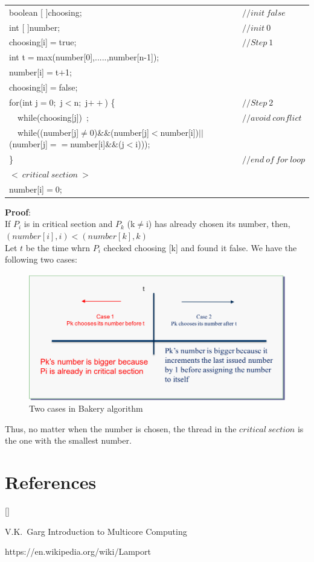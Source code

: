 \documentclass[twoside]{article}
\def\beginrefs{\begin{list}%
        {[\arabic{equation}]}{\usecounter{equation}
         \setlength{\leftmargin}{2.0truecm}\setlength{\labelsep}{0.4truecm}%
         \setlength{\labelwidth}{1.6truecm}}}
\def\endrefs{\end{list}}
\def\bibentry#1{\item[\hbox{[#1]}]}
\begin{document}
\begin{table}[ht]
    \centering
    \begin{tabular}{l  l}
         boolean [ ]choosing; & $//init\ false$ \\
         int [ ]number; & $//init\ 0$ \\
         choosing[i]$=$true; & $//Step\ 1$ \\
         int t$=$max(number[0],.....,number[n-1]); & \\
         number[i]$=$t$+$1; & \\
         choosing[i]$=$false; & \\
         for(int j$=$0;\ j$<$n;\ j$++$) \{ & $//Step\ 2$ \\
         \ \ while(choosing[j])\ ; & $//avoid\ conflict$ \\
         \ \ while((number[j]$\neq$0)\&\&(number[j]$<$number[i])$||$(number[j]$==$number[i]\&\&(j$<$i))); & \\
         \} & $//end\ of\ for\ loop$ \\
         $ <\ critical\ section\ > $ & \\
         number[i]$=$0; & \\
    \end{tabular}
\end{table} 

\textbf{Proof}:\\
If $P_i$ is in critical section and $P_k$ (k$\neq$i) has already chosen its number, then, 
$(number[i], i)<(number[k], k)$ \\
Let $t$ be the time whrn $P_i$ checked choosing [k] and found it false. We have the following two cases:

\begin{figure}[ht]
    \includegraphics[scale=0.5]{Bakery_proof}
    \centering
    \caption{Two cases in Bakery algorithm}
\end{figure}

Thus, no matter when the number is chosen, the thread in the $critical\ section$ is the one with the smallest number. 



\section*{References}
\beginrefs
\bibentry{1}{\sc V.K.~Garg} Introduction to Multicore Computing
\bibentry{2} https://en.wikipedia.org/wiki/Lamport%
\endrefs
\end{document}
